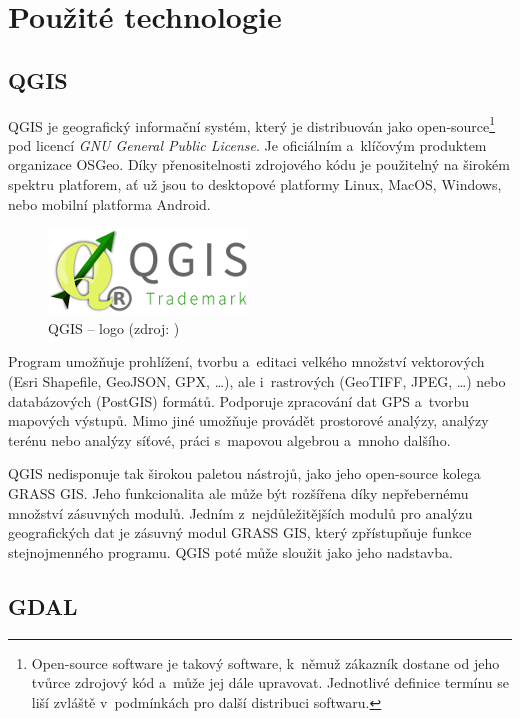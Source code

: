 \documentclass[a4paper,12pt,oneside]{book}
\begin{document}
\clearpage
\chapter{Použité technologie}

\section{QGIS}

QGIS je geografický informační systém, který je distribuován jako
open-source\footnote{Open-source software je takový software, k~němuž
zákazník dostane od jeho tvůrce zdrojový kód a~může jej dále
upravovat. Jednotlivé definice termínu  se liší
zvláště v~podmínkách pro další distribuci
softwaru.\cite{abclinuxu_opensource}} pod licencí \textit{GNU
General Public License}. Je oficiálním a~klíčovým produktem
organizace OSGeo. Díky přenositelnosti zdrojového kódu je použitelný
na širokém spektru platforem, ať už jsou to desktopové platformy
Linux, MacOS, Windows, nebo mobilní platforma Android.

\begin{figure}[htb]
\centering
\includegraphics[scale=1]{images/qgis-logo.png}
\caption[QGIS -- logo]{QGIS -- logo (zdroj: \cite{qgis})}
\end{figure}

Program umožňuje prohlížení, tvorbu a~editaci velkého množství
vektorových (Esri Shapefile, GeoJSON, GPX, \dots), ale i~rastrových
(GeoTIFF, JPEG, \dots) nebo databázových (PostGIS) formátů. Podporuje zpracování
dat GPS a~tvorbu mapových výstupů. Mimo jiné umožňuje provádět
prostorové analýzy, analýzy terénu nebo analýzy síťové, práci
s~mapovou algebrou a~mnoho dalšího.

QGIS nedisponuje tak širokou paletou nástrojů, jako jeho open-source
kolega GRASS GIS. Jeho funkcionalita ale může být rozšířena díky
nepřebernému množství zásuvných modulů. Jedním z~nejdůležitějších
modulů pro analýzu geografických dat je zásuvný modul GRASS GIS, který
zpřístupňuje funkce stejnojmenného programu. QGIS poté může sloužit
jako jeho nadstavba.  \cite{qgis} \cite{qgis_wiki}


\section{GDAL}
\label{l_gdal}
\end{document}
